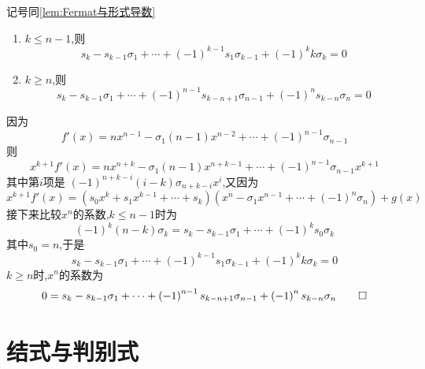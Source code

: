 \begin{formal}
\begin{theorem}[Newton公式]\label{thm:Newton公式}
记号同\cref{lem:Fermat与形式导数}
\begin{enumerate}  [label = {\textup{(\arabic*)}}]
    \item $k\leqslant n-1$,则
    \[
    s_k-s_{k-1}\sigma_1+\cdots+\left(-1\right)^{k-1}s_1\sigma_{k-1}+\left(-1\right)^k k\sigma_k=0\]
    \item $k\geqslant n$,则
    \[
    s_k-s_{k-1}\sigma_1+\cdots+
    \left(-1\right)^{n-1}s_{k - n+1}\sigma_{n-1}+
    \left(-1\right)^{n}s_{k-n}\sigma_n=0
    \]
\end{enumerate}
\end{theorem}
\begin{Proof}
因为
\[
f'\left(x\right)=
nx^{n-1}-\sigma_1\left(
    n-1
\right)x^{n-2}+\cdots+\left(-1\right)^{n-1}\sigma_{n-1}
\]
则
\[
x^{k+1} f'\left(x\right)=
nx^{n+k} -\sigma_1\left(
    n-1
\right)x^{n+k-1}+\cdots+\left(-1\right)^{n-1}\sigma_{n-1}x^{k+1}
\]
其中第$i$项是
$
\left(-1\right)^{n+k-i}\left(i-k\right)\sigma_{n+k-i} x^{i}
$,又因为
\[
x^{k+1}  f'\left(x\right)=
\left(
    s_0x^k+s_1x^{k-1}+\cdots+s_k
\right)\left(
    x^n-\sigma_1x^{n-1}+\cdots+\left(-1\right)^n\sigma_n
\right)+g\left(x\right)
\]接下来比较$x^n$的系数,$k\leqslant n-1$时为
\[
\left(-1\right)^k\left(n-k\right)\sigma_k
=s_k-s_{k-1}\sigma_1+\cdots+\left(-1\right)^{k}s_0\sigma_{k}
\]
其中$s_0=n$,于是
\[
s_k-s_{k-1}\sigma_1+\cdots+\left(-1\right)^{k-1}s_1\sigma_{k-1}+\left(-1\right)^k k\sigma_k=0
\]
$k\geqslant n$时,$x^n$的系数为
\[
0= s_k-s_{k-1}\sigma_1+\cdots+
\left(-1\right)^{n-1}s_{k - n+1}\sigma_{n-1}+
\left(-1\right)^{n}s_{k-n}\sigma_n\qedhere
\]
\end{Proof}
\end{formal}
\newpage
\section{结式与判别式}
